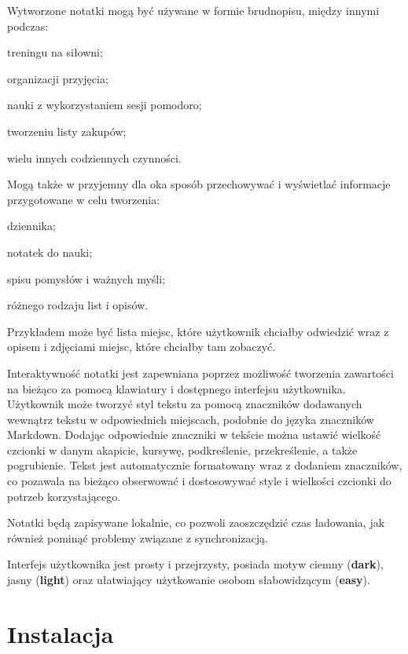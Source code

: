 \documentclass[shortabstract]{iithesis}
\begin{document}
Wytworzone notatki mogą być używane w formie brudnopisu, między innymi podczas:
\begin{compactitem}
    \item treningu na siłowni;
    \item organizacji przyjęcia;
    \item nauki z wykorzystaniem sesji pomodoro;
    \item tworzeniu listy zakupów;
    \item wielu innych codziennych czynności.
\end{compactitem}

Mogą także w przyjemny dla oka sposób przechowywać i wyświetlać informacje przygotowane w celu tworzenia:
\begin{compactitem}
 \item dziennika;
 \item notatek do nauki;
 \item spisu pomysłów i ważnych myśli;
 \item różnego rodzaju list i opisów.
\end{compactitem}
 Przykładem może być lista miejsc, które użytkownik chciałby odwiedzić wraz z opisem i zdjęciami miejsc, które chciałby tam zobaczyć.

Interaktywność notatki jest zapewniana poprzez możliwość tworzenia zawartości na bieżąco za pomocą klawiatury i dostępnego interfejsu użytkownika.
Użytkownik może tworzyć styl tekstu za pomocą znaczników dodawanych wewnątrz tekstu w odpowiednich miejscach, podobnie do języka znaczników Markdown.
Dodając odpowiednie znaczniki w tekście można ustawić wielkość czcionki w danym akapicie, kursywę, podkreślenie, przekreślenie, a także pogrubienie.
Tekst jest automatycznie formatowany wraz z dodaniem znaczników, co pozawala na bieżąco obserwować i dostosowywać style i wielkości czcionki do potrzeb korzystającego.

Notatki będą zapisywane lokalnie, co pozwoli zaoszczędzić czas ładowania, jak również pominąć problemy związane z synchronizacją.

Interfejs użytkownika jest prosty i przejrzysty, posiada motyw ciemny (\textbf{dark}), jasny (\textbf{light}) oraz ułatwiający użytkowanie osobom słabowidzącym (\textbf{easy}).







\chapter{Instalacja}
\end{document}
